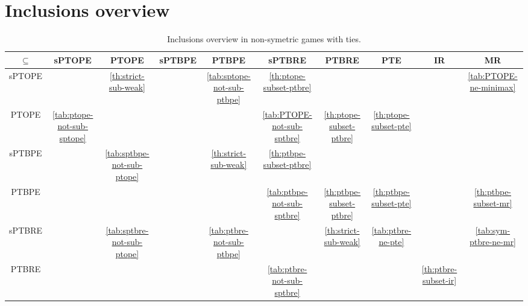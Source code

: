 \section{Inclusions overview}
\begin{sidewaystable}
	\caption{Inclusions overview in non-symetric games with ties.}
	\centering
	\begin{tabular}{|c|c|c|c|c|c|c|c|c|c|}
		\hline
		$\subseteq$  & sPTOPE & PTOPE & sPTBPE & PTBPE & sPTBRE & PTBRE & PTE & IR & MR \\
		\hline
		sPTOPE & \cellcolor{gray!30} & \cellcolor{green!30} \autoref{th:strict-sub-weak} & \cellcolor{red!15} & \cellcolor{red!25} \autoref{tab:sptope-not-sub-ptbpe} & \cellcolor{green!30} \autoref{th:ptope-subset-ptbre} & \cellcolor{green!15} & \cellcolor{green!15} & \cellcolor{green!15} & \cellcolor{red!30} \autoref{tab:PTOPE-ne-minimax} \\
		\hline
		PTOPE & \cellcolor{red!30} \autoref{tab:ptope-not-sub-sptope} & \cellcolor{gray!30} & \cellcolor{red!15} & \cellcolor{red!15} & \cellcolor{red!30} \autoref{tab:PTOPE-not-sub-sptbre} & \cellcolor{green!30} \autoref{th:ptope-subset-ptbre} & \cellcolor{green!30} \autoref{th:ptope-subset-pte} & \cellcolor{green!15} & \cellcolor{red!15} \\
		\hline
		sPTBPE & \cellcolor{red!15} & \cellcolor{red!30} \autoref{tab:sptbpe-not-sub-ptope} & \cellcolor{gray!30} & \cellcolor{green!30} \autoref{th:strict-sub-weak} & \cellcolor{green!30} \autoref{th:ptbpe-subset-ptbre} & \cellcolor{green!15} & \cellcolor{green!15} & \cellcolor{green!15} & \cellcolor{green!15} \\
		\hline
		PTBPE & \cellcolor{red!15} & \cellcolor{red!15} & \cellcolor{red!15} & \cellcolor{gray!30} & \cellcolor{red!30} \autoref{tab:ptbpe-not-sub-sptbre} & \cellcolor{green!30} \autoref{th:ptbpe-subset-ptbre} & \cellcolor{green!30} \autoref{th:ptbpe-subset-pte} & \cellcolor{green!15} & \cellcolor{green!30} \autoref{th:ptbpe-subset-mr} \\
		\hline
		sPTBRE & \cellcolor{red!15} & \cellcolor{red!30} \autoref{tab:sptbre-not-sub-ptope} & \cellcolor{red!15} & \cellcolor{red!30} \autoref{tab:ptbre-not-sub-ptbpe} & \cellcolor{gray!30} & \cellcolor{green!30} \autoref{th:strict-sub-weak} & \cellcolor{red!30} \autoref{tab:ptbre-ne-pte} & \cellcolor{green!15} & \cellcolor{red!30} \autoref{tab:sym-ptbre-ne-mr} \\
		\hline
		PTBRE & \cellcolor{red!15} & \cellcolor{red!15} & \cellcolor{red!15} & \cellcolor{red!15} & \cellcolor{red!30} \autoref{tab:ptbre-not-sub-sptbre} & \cellcolor{gray!30} & \cellcolor{red!15} & \cellcolor{green!30} \autoref{th:ptbre-subset-ir} & \cellcolor{red!15} \\

\end{tabular}
\end{sidewaystable}
